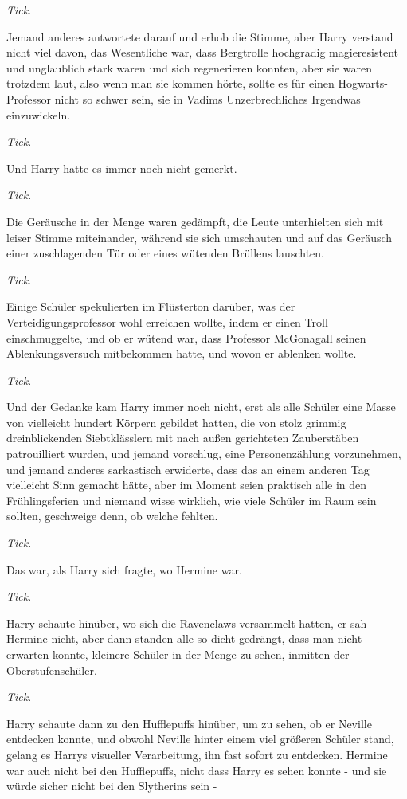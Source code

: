 \emph{Tick}.

Jemand anderes antwortete darauf und erhob die Stimme, aber Harry verstand nicht
viel davon, das Wesentliche war, dass Bergtrolle hochgradig magieresistent und
unglaublich stark waren und sich regenerieren konnten, aber sie waren trotzdem
laut, also wenn man sie kommen hörte, sollte es für einen Hogwarts-Professor
nicht so schwer sein, sie in Vadims Unzerbrechliches Irgendwas einzuwickeln.

\emph{Tick}.

Und Harry hatte es immer noch nicht gemerkt.

\emph{Tick}.

Die Geräusche in der Menge waren gedämpft, die Leute unterhielten sich mit
leiser Stimme miteinander, während sie sich umschauten und auf das Geräusch
einer zuschlagenden Tür oder eines wütenden Brüllens lauschten.

\emph{Tick}.

Einige Schüler spekulierten im Flüsterton darüber, was der
Verteidigungsprofessor wohl erreichen wollte, indem er einen Troll
einschmuggelte, und ob er wütend war, dass Professor McGonagall seinen
Ablenkungsversuch mitbekommen hatte, und wovon er ablenken wollte.

\emph{Tick}.

Und der Gedanke kam Harry immer noch nicht, erst als alle Schüler eine Masse von
vielleicht hundert Körpern gebildet hatten, die von stolz grimmig
dreinblickenden Siebtklässlern mit nach außen gerichteten Zauberstäben
patrouilliert wurden, und jemand vorschlug, eine Personenzählung vorzunehmen,
und jemand anderes sarkastisch erwiderte, dass das an einem anderen Tag
vielleicht Sinn gemacht hätte, aber im Moment seien praktisch alle in den
Frühlingsferien und niemand wisse wirklich, wie viele Schüler im Raum sein
sollten, geschweige denn, ob welche fehlten.

\emph{Tick}.

Das war, als Harry sich fragte, wo Hermine war.

\emph{Tick}.

Harry schaute hinüber, wo sich die Ravenclaws versammelt hatten, er sah Hermine
nicht, aber dann standen alle so dicht gedrängt, dass man nicht erwarten konnte,
kleinere Schüler in der Menge zu sehen, inmitten der Oberstufenschüler.

\emph{Tick}.

Harry schaute dann zu den Hufflepuffs hinüber, um zu sehen, ob er Neville
entdecken konnte, und obwohl Neville hinter einem viel größeren Schüler stand,
gelang es Harrys visueller Verarbeitung, ihn fast sofort zu entdecken. Hermine
war auch nicht bei den Hufflepuffs, nicht dass Harry es sehen konnte - und sie
würde sicher nicht bei den Slytherins sein -

